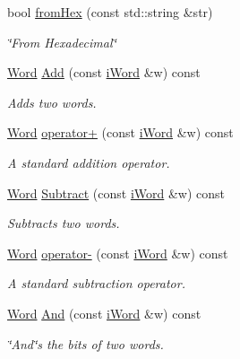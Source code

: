\begin{DoxyCompactItemize}
bool \hyperlink{classWord_a2cb556e157d56e97d623b2e120ee0a6c}{fromHex} (const std::string \&str)
\begin{DoxyCompactList}\small\item\em \char`\"{}From Hexadecimal\char`\"{} \item\end{DoxyCompactList}\item 
\hyperlink{classWord}{Word} \hyperlink{classWord_ae9478910c6cb8c30abeedf7fc6ba5b36}{Add} (const \hyperlink{classiWord}{iWord} \&w) const 
\begin{DoxyCompactList}\small\item\em Adds two words. \item\end{DoxyCompactList}\item 
\hyperlink{classWord}{Word} \hyperlink{classWord_a0fa830d2d54ba68107d035c316b8d3ab}{operator+} (const \hyperlink{classiWord}{iWord} \&w) const 
\begin{DoxyCompactList}\small\item\em A standard addition operator. \item\end{DoxyCompactList}\item 
\hyperlink{classWord}{Word} \hyperlink{classWord_aef1af160cdcc631473aec52ea883e2e5}{Subtract} (const \hyperlink{classiWord}{iWord} \&w) const 
\begin{DoxyCompactList}\small\item\em Subtracts two words. \item\end{DoxyCompactList}\item 
\hyperlink{classWord}{Word} \hyperlink{classWord_af930dcccdcf2cdbb90df31ac61a4933c}{operator-\/} (const \hyperlink{classiWord}{iWord} \&w) const 
\begin{DoxyCompactList}\small\item\em A standard subtraction operator. \item\end{DoxyCompactList}\item 
\hyperlink{classWord}{Word} \hyperlink{classWord_a08eca1ca0af51daee452ba719f9407c5}{And} (const \hyperlink{classiWord}{iWord} \&w) const 
\begin{DoxyCompactList}\small\item\em \char`\"{}And\char`\"{}s the bits of two words. \item\end{DoxyCompactList}\item 

\end{DoxyCompactItemize}
